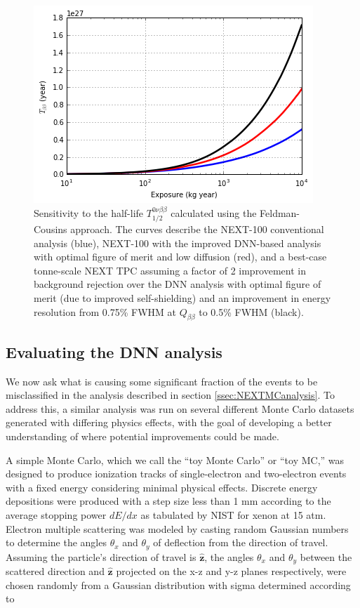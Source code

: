 \documentclass[a4paper,11pt]{article}
\begin{document}
\begin{figure}[!htb]
	\centering
	\includegraphics[scale=0.8]{fig/half_life_sensitivity.png}
	\caption{\label{fig.halflife}Sensitivity to the half-life $T^{0\nu\beta\beta}_{1/2}$ calculated using the Feldman-Cousins approach.  The curves describe the NEXT-100 conventional analysis \cite{NEXT_sensitivity} (blue), NEXT-100 with the improved DNN-based analysis with optimal figure of merit and low diffusion (red), and a best-case tonne-scale NEXT TPC assuming a factor of 2 improvement in background rejection over the DNN analysis with optimal figure of merit (due to improved self-shielding) and an improvement in energy resolution from 0.75\% FWHM at $Q_{\beta\beta}$ to 0.5\% FWHM (black).}
\end{figure}

\subsection{Evaluating the DNN analysis}\label{ssec:DNNeval}
We now ask what is causing some significant fraction of the events to be misclassified in the analysis described in section \ref{ssec:NEXTMCanalysis}.  To address this, a similar analysis was run 
on several different Monte Carlo datasets generated with differing physics effects, with the goal of developing a better understanding of where potential improvements could be made.

A simple Monte Carlo, which we call the ``toy Monte Carlo'' or ``toy MC,'' was designed to produce ionization tracks of single-electron and two-electron events with a fixed energy
considering minimal physical effects.  Discrete energy depositions were produced with a step size less than 1 mm according to the average stopping power $dE/dx$ as tabulated by
NIST \cite{NIST_mac} for xenon at 15 atm.  Electron multiple scattering was modeled by casting random Gaussian numbers to determine the angles $\theta_{x}$ and $\theta_{y}$ of deflection
from the direction of travel.  Assuming the particle's direction of travel is $\hat{\mathbf{z}}$, the angles $\theta_{x}$ and $\theta_{y}$ between the scattered direction and $\hat{\mathbf{z}}$ projected on 
the x-z and y-z planes respectively, were chosen randomly from a Gaussian distribution with sigma determined according to
\end{document}
